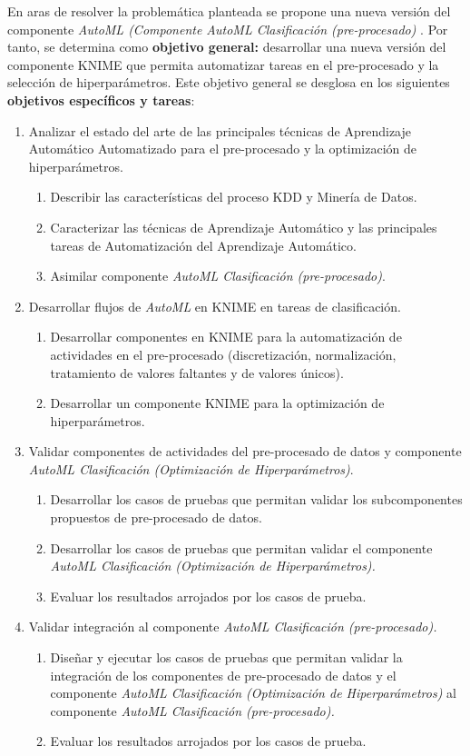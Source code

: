 En aras de resolver la problemática planteada se propone una nueva versión del componente \textit{AutoML (Componente AutoML Clasificación (pre-procesado)} \citep{Carrazana2022}. Por tanto, se determina como \textbf{objetivo general:} desarrollar una nueva versión del componente KNIME que permita automatizar tareas en el pre-procesado y la selección de hiperparámetros. Este objetivo general se desglosa en los siguientes \textbf{objetivos específicos y tareas}:

\begin{enumerate}
	\item Analizar el estado del arte de las principales técnicas de Aprendizaje Automático Automatizado para el pre-procesado y la optimización de hiperparámetros.
	\begin{enumerate}
		\item Describir las características del proceso KDD y Minería de Datos. 
		\item Caracterizar las técnicas de Aprendizaje Automático y las principales tareas de Automatización del Aprendizaje Automático.
		\item Asimilar componente \textit{AutoML Clasificación (pre-procesado)}.
	\end{enumerate}
	\item Desarrollar flujos de \textit{AutoML} en KNIME en tareas de clasificación.
	\begin{enumerate}
		\item Desarrollar componentes en KNIME para la automatización de actividades en el pre-procesado (discretización, normalización, tratamiento de valores faltantes y de valores únicos).
		\item Desarrollar un componente KNIME para la optimización de hiperparámetros.
	\end{enumerate}
	\item Validar componentes de actividades del pre-procesado de datos y componente \textit{AutoML Clasificación (Optimización de Hiperparámetros)}.
	\begin{enumerate}
		\item Desarrollar los casos de pruebas que permitan validar los subcomponentes propuestos de pre-procesado de datos. 
		\item Desarrollar los casos de pruebas que permitan validar el componente \textit{AutoML Clasificación (Optimización de Hiperparámetros).}
		\item Evaluar los resultados arrojados por los casos de prueba.
	\end{enumerate} 
	\item Validar integración al componente \textit{AutoML Clasificación (pre-procesado).}
	\begin{enumerate}
		\item Diseñar y ejecutar los casos de pruebas que permitan validar la integración de los componentes de pre-procesado de datos y el componente\textit{ AutoML Clasificación (Optimización de Hiperparámetros)} al componente\textit{ AutoML Clasificación (pre-procesado).}
		\item Evaluar los resultados arrojados por los casos de prueba.
	\end{enumerate}
\end{enumerate}

